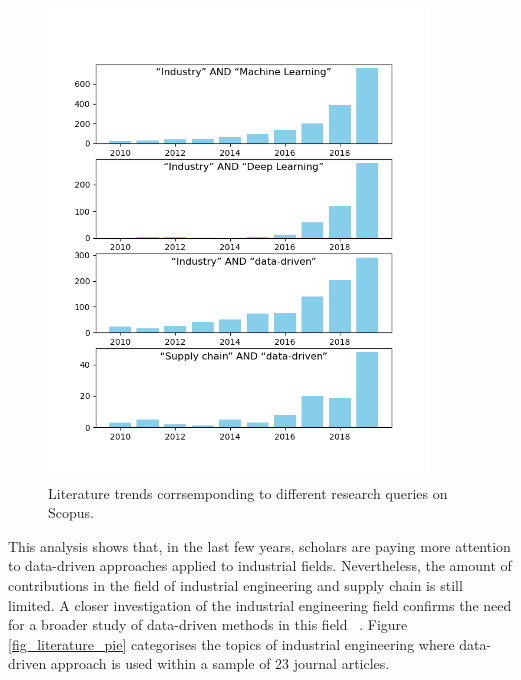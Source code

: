 \begin{figure}[hbt!]
\centering
\includegraphics[width=0.9\textwidth]{SectionIntroduction/researchBackground_figures/fig_literature_trend.png}
\captionsetup{type=figure}
\caption{Literature trends corrsemponding to different research queries on Scopus.}
\label{fig_literature_trend}
\end{figure}

This analysis shows that, in the last few years, scholars are paying more attention to data-driven approaches applied to industrial fields. Nevertheless, the amount of contributions in the field of industrial engineering and supply chain is still limited. A closer investigation of the industrial engineering field confirms the need for a broader study of data-driven methods in this field ~\cite{Nguyen2018}. Figure \ref{fig_literature_pie} categorises the topics of industrial engineering where  data-driven approach is used within a sample of 23 journal articles.

